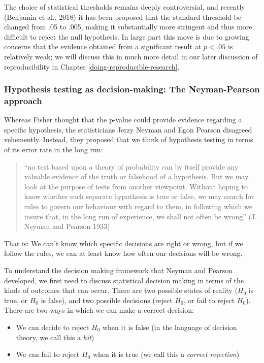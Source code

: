 \documentclass[]{book}
\providecommand{\tightlist}{%
  \setlength{\itemsep}{0pt}\setlength{\parskip}{0pt}}
\theoremstyle{definition}
\theoremstyle{definition}
\theoremstyle{definition}
\theoremstyle{remark}
\begin{document}
The choice of statistical thresholds remains deeply controversial, and
recently (Benjamin et al., 2018) it has been proposed that the standard
threshold be changed from .05 to .005, making it substantially more
stringent and thus more difficult to reject the null hypothesis. In
large part this move is due to growing concerns that the evidence
obtained from a significant result at \(p < .05\) is relatively weak; we
will discuss this in much more detail in our later discussion of
reproducibility in Chapter \ref{doing-reproducible-research}.

\subsubsection{Hypothesis testing as decision-making: The Neyman-Pearson
approach}\label{hypothesis-testing-as-decision-making-the-neyman-pearson-approach}

Whereas Fisher thought that the p-value could provide evidence regarding
a specific hypothesis, the statisticians Jerzy Neyman and Egon Pearson
disagreed vehemently. Instead, they proposed that we think of hypothesis
testing in terms of its error rate in the long run:

\begin{quote}
``no test based upon a theory of probability can by itself provide any
valuable evidence of the truth or falsehood of a hypothesis. But we may
look at the purpose of tests from another viewpoint. Without hoping to
know whether each separate hypothesis is true or false, we may search
for rules to govern our behaviour with regard to them, in following
which we insure that, in the long run of experience, we shall not often
be wrong'' (J. Neyman and Pearson 1933)
\end{quote}

That is: We can't know which specific decisions are right or wrong, but
if we follow the rules, we can at least know how often our decisions
will be wrong.

To understand the decision making framework that Neyman and Pearson
developed, we first need to discuss statistical decision making in terms
of the kinds of outcomes that can occur. There are two possible states
of reality (\(H_0\) is true, or \(H_0\) is false), and two possible
decisions (reject \(H_0\), or fail to reject \(H_0\)). There are two
ways in which we can make a correct decision:

\begin{itemize}
\tightlist
\item
  We can decide to reject \(H_0\) when it is false (in the language of
  decision theory, we call this a \emph{hit})
\item
  We can fail to reject \(H_0\) when it is true (we call this a
  \emph{correct rejection})
\end{itemize}
\end{document}
